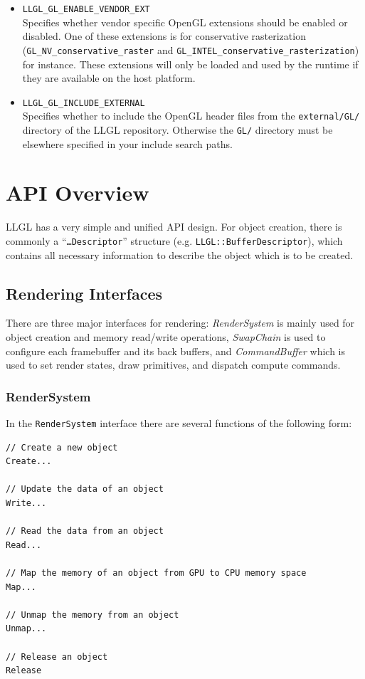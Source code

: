 \documentclass{article}
\begin{document}
\begin{itemize}
	\item \texttt{LLGL\_GL\_ENABLE\_VENDOR\_EXT} \\
	Specifies whether vendor specific OpenGL extensions should be enabled or disabled.
	One of these extensions is for conservative rasterization
	(\texttt{GL\_NV\_conservative\_raster} and \texttt{GL\_INTEL\_conservative\_rasterization}) for instance.
	These extensions will only be loaded and used by the runtime if they are available on the host platform.
	
	\item \texttt{LLGL\_GL\_INCLUDE\_EXTERNAL} \\
	Specifies whether to include the OpenGL header files from the \texttt{external/GL/} directory of the LLGL repository.
	Otherwise the \texttt{GL/} directory must be elsewhere specified in your include search paths.
\end{itemize}



\clearpage
\newpage
\section{API Overview}

LLGL has a very simple and unified API design.
For object creation, there is commonly a ``\texttt{\dots Descriptor}'' structure (e.g. \texttt{LLGL::BufferDescriptor}),
which contains all necessary information to describe the object which is to be created.

\subsection{Rendering Interfaces}

There are three major interfaces for rendering:
\emph{RenderSystem} is mainly used for object creation and memory read/write operations,
\emph{SwapChain} is used to configure each framebuffer and its back buffers,
and \emph{CommandBuffer} which is used to set render states, draw primitives, and dispatch compute commands.

\subsubsection{RenderSystem}

In the \texttt{RenderSystem} interface there are several functions of the following form:
\begin{lstlisting}
// Create a new object
Create...

// Update the data of an object
Write...

// Read the data from an object
Read...

// Map the memory of an object from GPU to CPU memory space
Map...

// Unmap the memory from an object
Unmap...

// Release an object
Release
\end{lstlisting}
\end{document}

